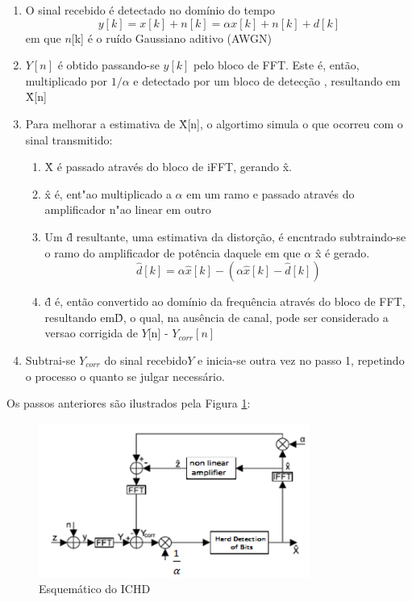 \begin{enumerate}
\item  O sinal recebido é detectado no domínio do tempo
\begin{equation}
y[k] = x[k] + n[k] = \alpha x[k] + n[k] +  d[k]
\end{equation}
em que $n$[k] é o ruído Gaussiano aditivo (AWGN)
\item $Y[n]$ é obtido passando-se $y[k]$ pelo bloco de FFT. Este é, então, multiplicado por $1/\alpha$ e detectado por um bloco de detecção , resultando em \^X[n]
\item Para melhorar a estimativa de \^X[n], o algortimo simula o que ocorreu com o sinal transmitido: 
\begin{enumerate}
\item 	\^X  é passado através do bloco de iFFT, gerando \^x.
\item 	\^x  é, ent"ao multiplicado a  $\alpha$ em um ramo e passado através do amplificador n"ao linear em outro
\item 	Um \^d resultante, uma estimativa da distorção, é encntrado subtraindo-se o ramo do amplificador de potência daquele em que $\alpha$ \^x é gerado. 
\begin{equation}
\hat{d}[k] = \alpha \hat{x}[k] -(\alpha \hat{x}[k] - \hat{d}[k]) 
\end{equation}
 \item 	\^d  é, então convertido ao domínio da frequência através do bloco de FFT, resultando em\^D, o qual, na ausência de canal, pode ser considerado a versao corrigida de $Y$[n] - $Y_{corr}[n]$
\end{enumerate}
\item 	Subtrai-se $Y_{corr}$ do sinal recebido$Y$ e inicia-se outra vez no passo 1, repetindo o processo o quanto se julgar necessário. 
\end{enumerate}

\par Os passos anteriores são ilustrados pela Figura \ref{ICHD}: 

\begin{figure}[h!]
\centering
\includegraphics[width=3.5in]{ICDH.png}
\caption{Esquemático do ICHD}
\label{ICHD}
\end{figure}

